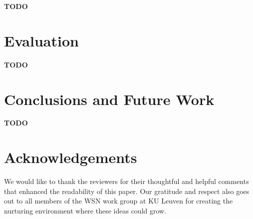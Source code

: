 \documentclass[conference]{IEEEtran}
\newcommand{\TODO}{\textbf{\color{red}TODO}}
\begin{document}
\TODO

\section{Evaluation}
\label{section:evaluation}

\TODO

\section{Conclusions and Future Work}
\label{section:conclusions}

\TODO

\section*{Acknowledgements}
\label{section:acknowledgements}

We would like to thank the reviewers for their thoughtful and helpful comments
that enhanced the readability of this paper. Our gratitude and respect also
goes out to all members of the WSN work group at KU Leuven for creating the
nurturing environment where these ideas could grow.



\end{document}
